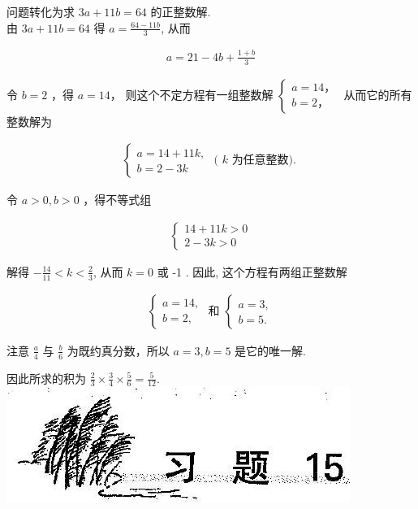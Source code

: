 \documentclass[10pt]{article}
\begin{document}
问题转化为求 $3 a+11 b=64$ 的正整数解.\\
由 $3 a+11 b=64$ 得 $a=\frac{64-11 b}{3}$, 从而

\begin{align*}
a=21-4 b+\frac{1+b}{3}
\end{align*}

令 $b=2$ ，得 $a=14 ，$ 则这个不定方程有一组整数解 $\left\{\begin{array}{l}a=14 ， \\ b=2 ，\end{array}\right.$ 从而它的所有整数解为

\begin{align*}
\left\{\begin{array}{l}
a=14+11 k, \\
b=2-3 k
\end{array} \text { ( } k\right. \text { 为任意整数). }
\end{align*}

令 $a>0, b>0$ ，得不等式组

\begin{align*}
\left\{\begin{array}{l}
14+11 k>0 \\
2-3 k>0
\end{array}\right.
\end{align*}

解得 $-\frac{14}{11}<k<\frac{2}{3}$, 从而 $k=0$ 或 -1 . 因此, 这个方程有两组正整数解

\begin{align*}
\left\{\begin{array} { l } 
{ a = 1 4 , } \\
{ b = 2 , }
\end{array} \text { 和 } \left\{\begin{array}{l}
a=3, \\
b=5 .
\end{array}\right.\right.
\end{align*}

注意 $\frac{a}{4}$ 与 $\frac{b}{6}$ 为既约真分数，所以 $a=3, b=5$ 是它的唯一解.

因此所求的积为 $\frac{2}{3} \times \frac{3}{4} \times \frac{5}{6}=\frac{5}{12}$.\\
\includegraphics[max width=\textwidth, center]{2024_10_30_26b590fd1106d28139f0g-099(1)}
\end{document}
